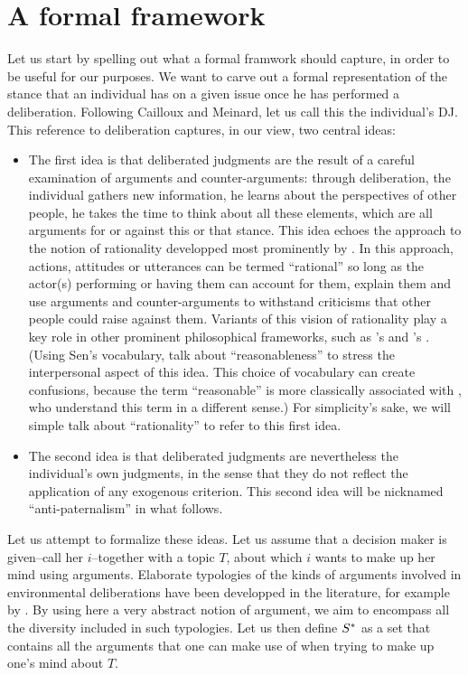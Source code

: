 \documentclass[smallextended,nospthms,natbib]{svjour3}
\begin{document}
\section{A formal framework}
Let us start by spelling out what a formal framwork should capture, in order to be useful for our purposes. We want to carve out a formal representation of the stance that an individual has on a given issue once he has performed a deliberation. Following Cailloux and Meinard, let us call this the individual's \ac{DJ}. This reference to deliberation captures, in our view, two central ideas:
\begin{itemize}
\item The first idea is that deliberated judgments are the result of a careful examination of arguments and counter-arguments: through deliberation, the individual gathers new information, he learns about the perspectives of other people, he takes the time to think about all these elements, which are all arguments for or against this or that stance. This idea echoes the approach to the notion of rationality developped most prominently by \citet{habermas_theorie_1981}. In this approach, actions, attitudes or utterances can be termed “rational” so long as the actor(s) performing or having them can account for them, explain them and use arguments and counter-arguments to withstand criticisms that other people could raise against them. Variants of this vision of rationality play a key role in other prominent philosophical frameworks, such as \citeauthor{scanlon_what_2000}’s \citeyearpar{scanlon_what_2000} and \citeauthor{sen_idea_2009}’s \citeyearpar{sen_idea_2009}. (Using Sen's vocabulary, \citet{bartkowski_beyond_2018} talk about ``reasonableness'' to stress the interpersonal aspect of this idea. This choice of vocabulary can create confusions, because the term ``reasonable'' is more classically associated with \citet{rawls_political_2005}, who understand this term in a different sense.) For simplicity's sake, we will simple talk about ``rationality'' to refer to this first idea.
\item The second idea is that deliberated judgments are nevertheless the individual's own judgments, in the sense that they do not reflect the application of any exogenous criterion. This second idea will be nicknamed ``anti-paternalism'' in what follows.
\end{itemize}

Let us attempt to formalize these ideas. Let us assume that a decision maker is given--call her $i$--together with a topic $T$, about which $i$ wants to make up her mind using arguments. Elaborate typologies of the kinds of arguments involved in environmental deliberations have been developped in the literature, for example by \citet{chateauraynaud_contrainte_2007}. By using here a very abstract notion of argument, we aim to encompass all the diversity included in such typologies. Let us then define $S^*$ as a set that contains all the arguments that one can make use of when trying to make up one’s mind about $T$.
\end{document}
